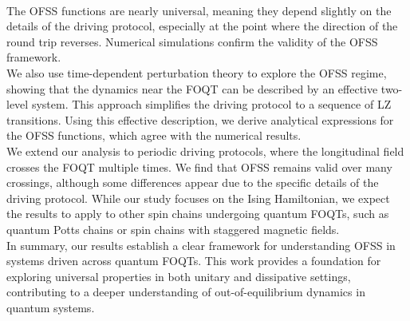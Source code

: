 \\$ $\\
The OFSS functions are nearly universal, meaning they depend slightly on the details of the driving protocol, especially at the point where the direction of the round trip reverses. Numerical simulations confirm the validity of the OFSS framework.
\\$ $\\
We also use time-dependent perturbation theory to explore the OFSS regime, showing that the dynamics near the FOQT can be described by an effective two-level system. This approach simplifies the driving protocol to a sequence of LZ transitions. Using this effective description, we derive analytical expressions for the OFSS functions, which agree with the numerical results.
\\$ $\\
We extend our analysis to periodic driving protocols, where the longitudinal field crosses the FOQT multiple times. We find that OFSS remains valid over many crossings, although some differences appear due to the specific details of the driving protocol. While our study focuses on the Ising Hamiltonian, we expect the results to apply to other spin chains undergoing quantum FOQTs, such as quantum Potts chains or spin chains with staggered magnetic fields.
\\$ $\\
In summary, our results establish a clear framework for understanding OFSS in systems driven across quantum FOQTs. This work provides a foundation for exploring universal properties in both unitary and dissipative settings, contributing to a deeper understanding of out-of-equilibrium dynamics in quantum systems.
